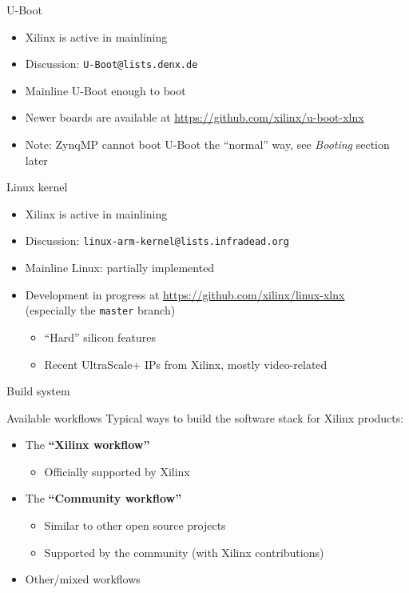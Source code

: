 \documentclass[xetex,table]{beamer}
\begin{document}
\begin{frame}{U-Boot}
  \begin{itemize}
  \item Xilinx is active in mainlining
  \item Discussion: \texttt{U-Boot@lists.denx.de}
  \item Mainline U-Boot enough to boot
  \item Newer boards are available at
    \url{https://github.com/xilinx/u-boot-xlnx}
  \item Note: ZynqMP cannot boot U-Boot the ``normal'' way, see {\em
    Booting} section later
  \end{itemize}
\end{frame}

\begin{frame}{Linux kernel}
  \begin{itemize}
  \item Xilinx is active in mainlining
  \item Discussion: \texttt{linux-arm-kernel@lists.infradead.org}
  \item Mainline Linux: partially implemented
  \item Development in progress at
    \url{https://github.com/xilinx/linux-xlnx}\\
    (especially the \texttt{master} branch)
    \begin{itemize}
      \item ``Hard'' silicon features
      \item Recent UltraScale+ IPs from Xilinx, mostly video-related
    \end{itemize}
  \end{itemize}
\end{frame}

\begin{frame}[standout]
  Build system
\end{frame}

\begin{frame}{Available workflows}
  Typical ways to build the software stack for Xilinx products:
  \begin{itemize}
  \item The {\bf ``Xilinx workflow''}
    \begin{itemize}
    \item Officially supported by Xilinx
    \end{itemize}
  \item The {\bf ``Community workflow''}
    \begin{itemize}
    \item Similar to other open source projects
    \item Supported by the community (with Xilinx contributions)
    \end{itemize}
  \item Other/mixed workflows
  \end{itemize}
\end{frame}
\end{document}
